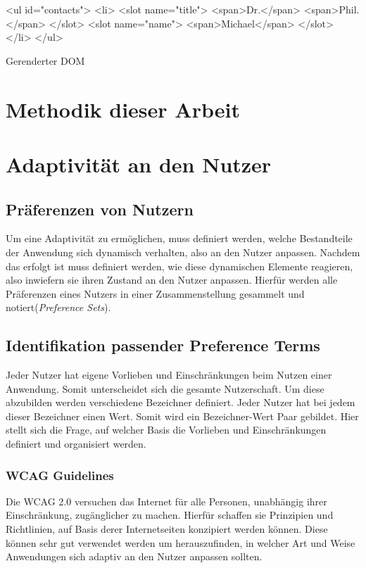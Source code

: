 \documentclass[12pt, paper=a4, bibtotoc, toc=listof, headsepline=true]{scrreprt}
\begin{document}
			\begin{listing}
				\begin{HTMLcode*}{}
<ul id="contacts">
   <li>
      <slot name="title">
	     <span>Dr.</span>
	     <span>Phil.</span>
	  </slot>
      <slot name="name">
	     <span>Michael</span>
      </slot>
   </li>
</ul>
				\end{HTMLcode*}
				\caption{Gerenderter DOM}
				\label{lst:renDom}
			\end{listing}
		
\chapter{Methodik dieser Arbeit}
\chapter{Adaptivität an den Nutzer}
	\section{Präferenzen von Nutzern}
	Um eine Adaptivität zu ermöglichen, muss definiert werden, welche Bestandteile der Anwendung sich dynamisch verhalten, also an den Nutzer anpassen. Nachdem das erfolgt ist muss definiert werden, wie diese dynamischen Elemente reagieren, also inwiefern sie ihren Zustand an den Nutzer anpassen. Hierfür werden alle Präferenzen eines Nutzers in einer Zusammenstellung gesammelt und notiert(\emph{Preference Sets}).
	\section{Identifikation passender Preference Terms}
	Jeder Nutzer hat eigene Vorlieben und Einschränkungen beim Nutzen einer Anwendung. Somit unterscheidet sich die gesamte Nutzerschaft. Um diese abzubilden werden verschiedene Bezeichner definiert. Jeder Nutzer hat bei jedem dieser Bezeichner einen Wert. Somit wird ein Bezeichner-Wert Paar gebildet. Hier stellt sich die Frage, auf welcher Basis die Vorlieben und Einschränkungen definiert und organisiert werden.
		\subsection{WCAG Guidelines}
		Die \ac{WCAG 2.0} versuchen das Internet für alle Personen, unabhängig ihrer Einschränkung, zugänglicher zu machen. Hierfür schaffen sie Prinzipien und Richtlinien, auf Basis derer Internetseiten konzipiert werden können. Diese können sehr gut verwendet werden um herauszufinden, in welcher Art und Weise Anwendungen sich adaptiv an den Nutzer anpassen sollten.
\end{document}
